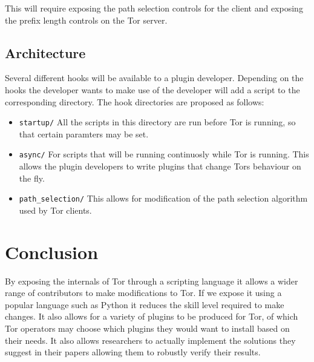 \documentclass[9pt,technote]{IEEEtran}
\begin{document}
This will require exposing the path selection controls for the client and exposing the prefix length controls on the Tor server.

\subsection{Architecture}
Several different hooks will be available to a plugin developer. Depending on
the hooks the developer wants to make use of the developer will add a script to
the corresponding directory. The hook directories are proposed as follows:
\begin{itemize}
\item \texttt{startup/} All the scripts in this directory are run before Tor is
	running, so that certain paramters may be set.
\item \texttt{async/} For scripts that will be running continuosly while Tor is
	running. This allows the plugin developers to write plugins that change
	Tors behaviour on the fly.
\item \texttt{path\_selection/} This allows for modification of the path
	selection algorithm used by Tor clients.
\end{itemize}



\section{Conclusion}
By exposing the internals of Tor through a scripting language it allows a wider
range of contributors to make modifications to Tor. If we expose it using a
popular language such as Python it reduces the skill level required to make
changes. It also allows for a variety of plugins to be produced for Tor, of
which Tor operators may choose which plugins they would want to install based
on their needs. It also allows researchers to actually implement the solutions
they suggest in their papers allowing them to robustly verify their results.



\end{document}
